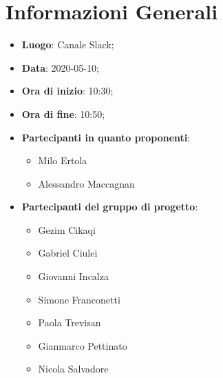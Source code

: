 \section{Informazioni Generali}
	\begin{itemize}
		\item \textbf {Luogo}: Canale Slack;
		\item \textbf {Data}: 2020-05-10;
		\item \textbf {Ora di inizio}: 10:30;
		\item \textbf {Ora di fine}: 10:50;
		\item \textbf {Partecipanti in quanto proponenti}:
		  \begin{itemize}
		    \item Milo Ertola
		    \item Alessandro Maccagnan
		  \end{itemize}
		\item \textbf {Partecipanti del gruppo di progetto}:
			\begin{itemize}
				\item Gezim Cikaqi
				\item Gabriel Ciulei
				\item Giovanni Incalza
				\item Simone Franconetti
				\item Paola Trevisan
				\item Gianmarco Pettinato
				\item Nicola Salvadore
			\end{itemize}
	\end{itemize}
